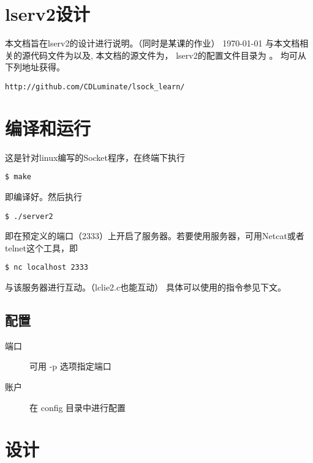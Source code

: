 \documentclass[a4paper,12pt]{article}
\begin{document}
\begin{CJK}{UTF8}{gbsn}

\section*{lserv2设计}
	本文档旨在lserv2的设计进行说明。（同时是某课的作业）\newline
	\today \newline
	与本文档相关的源代码文件为以及, 本文档的源文件为，
	lserv2的配置文件目录为 。 均可从下列地址获得。
	\begin{verbatim}
http://github.com/CDLuminate/lsock_learn/
	\end{verbatim}

\tableofcontents
\newpage

\section{编译和运行}
	这是针对linux编写的Socket程序，在终端下执行
	\begin{verbatim}
$ make
	\end{verbatim}
	即编译好。然后执行
	\begin{verbatim}
$ ./server2
	\end{verbatim}
	即在预定义的端口（2333）上开启了服务器。若要使用服务器，可用Netcat或者telnet这个工具，即
	\begin{verbatim}
$ nc localhost 2333
	\end{verbatim}
	与该服务器进行互动。（lclie2.c也能互动）\newline
	具体可以使用的指令参见下文。
\subsection{配置}
	\begin{description}
	\item[端口] 可用 -p 选项指定端口
	\item[账户] 在 config 目录中进行配置
	\end{description}

\newpage
\section{设计}

\end{CJK}
\end{document}
